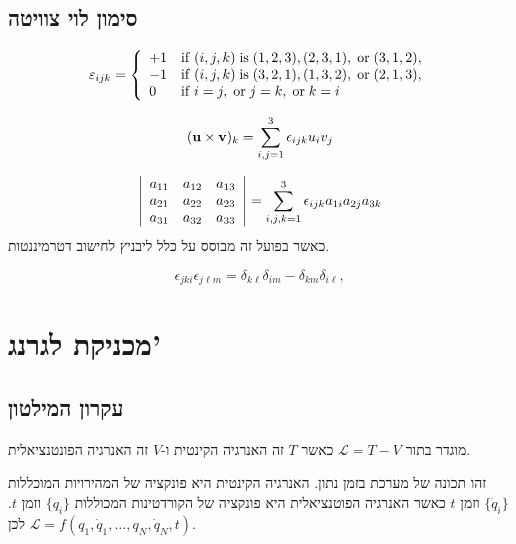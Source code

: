 \documentclass{tstextbook}
\begin{document}
\section{סימון לוי צוויטה}

\begin{definition}
$$\varepsilon_{i j k}={\left\{\begin{array}{l l}{+1}&{{\mathrm{if}}\;(i,j,k)\;{\mathrm{is}}\;(1,2,3),(2,3,1),\;{\mathrm{or}}\;(3,1,2),}\\ {-1}&{{\mathrm{if}}\;(i,j,k)\;{\mathrm{is}}\;(3,2,1),(1,3,2),\;{\mathrm{or}}\;(2,1,3),}\\ {0}&{{\mathrm{if}}\;i=j,\;{\mathrm{or}}\;j=k,\;{\mathrm{or}}\;k=i}\end{array}\right.}$$

\end{definition}
\begin{proposition}
$$({\bf u}\times{\bf v})_{k}=\sum_{i,j=1}^{3}\epsilon_{i j k}u_{i}v_{j}$$

\end{proposition}
\begin{proposition}
$${\left|\begin{array}{l l l}{a_{11}}&{a_{12}}&{a_{13}}\\ {a_{21}}&{a_{22}}&{a_{23}}\\ {a_{31}}&{a_{32}}&{a_{33}}\end{array}\right|}=\sum_{i,j,k=1}^{3}\epsilon_{i j k}a_{1i}a_{2j}a_{3k}$$
כאשר בפועל זה מבוסס על כלל ליבניץ לחישוב דטרמיננטות.

\end{proposition}
\begin{proposition}
$$\epsilon_{j k i}\epsilon_{j\ell m}=\delta_{k\ell}\delta_{i m}-\delta_{k m}\delta_{i\ell},$$

\end{proposition}
\chapter{מכניקת לגרנג'}

\section{עקרון המילטון}

\begin{definition}
מוגדר בתור \(\mathcal{L} =T-V\) כאשר \(T\) זה האנרגיה הקינטית ו-\(V\) זה האנרגיה הפונטנציאלית.

\end{definition}
זהו תכונה של מערכת בזמן נתון. האנרגיה הקינטית היא פונקציה של המהירויות המוכללות \(\{ \dot{q}_{i} \}\) וזמן \(t\) כאשר האנרגיה הפוטנציאלית היא פונקציה של הקורדטינות המכוללות \(\{ q_{i} \}\) וזמן \(t\). לכן \(\mathcal{L} =f\left( q_1,\dot{q}_{1},\dots,q_{N},\dot{q}_{N},t \right)\).
\end{document}
